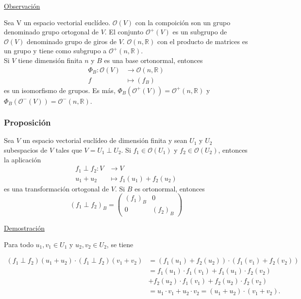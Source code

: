 \documentclass[12pt, a4paper, ones, notitlepage, openany,titlepage]{article}
\begin{document}
\noindent\underline{Observación}

Sea V un espacio vectorial euclídeo. $\mathcal{O}(V)$ con la compoición son un grupo denominado grupo ortogonal de $V$. El conjunto $\mathcal{O}^+(V)$ es un subgrupo de $\mathcal{O}(V)$ denominado grupo de giros de $V$. $\mathcal{O}(n,\mathbb{R})$ con el producto de matrices es un grupo y tiene como subgrupo a $\mathcal{O}^+(n, \mathbb{R})$.\\
Si $V$ tiene dimensión finita $n$ y $B$ es una base ortonormal, entonces
$$
\begin{aligned}
	\Phi_B : \mathcal{O}(V) & \longrightarrow \mathcal{O}(n,\mathbb{R}) \\
	f & \longmapsto (f_B)
\end{aligned}
$$
\noindent es un isomorfismo de grupos. Es más, $\Phi_B(\mathcal{O}^+(V)) = \mathcal{O}^+(n, \mathbb{R})$ y $\Phi_B(\mathcal{O}^-(V)) = \mathcal{O}^-(n, \mathbb{R})$. 

\subsubsection{Proposición}
Sea $V$ un espacio vectorial euclídeo de dimensión finita y sean $U_{1}$ y $U_{2}$ subespacios de $V$ tales que $V=U_{1} \perp U_{2}$. Si $f_{1} \in \mathcal{O}\left(U_{1}\right)$ y $f_{2} \in \mathcal{O}\left(U_{2}\right)$, entonces la aplicación
$$
\begin{aligned}
	f_{1} \perp f_{2}: V & \longrightarrow V \\
	u_1 + u_2 & \longmapsto f_1(u_1) + f_2(u_2)
\end{aligned}
$$
\noindent es una transformación ortogonal de $V$. Si $B$ es ortonormal, entonces
$$
(f_1 \perp f_2)_B = 
\left(\begin{array}{c|c}
	(f_1)_B & 0 \\
	\hline
	0 & (f_2)_B
\end{array}\right)
$$

\noindent\underline{Demostración}

\noindent Para todo $u_{1}, v_{1} \in U_{1}$ y $u_{2}, v_{2} \in U_{2}$, se tiene

$$
\begin{aligned}
	\left(f_{1} \perp f_{2}\right)\left(u_{1}+u_{2}\right) \cdot\left(f_{1} \perp f_{2}\right)\left(v_{1}+v_{2}\right) & =\left(f_{1}\left(u_{1}\right)+f_{2}\left(u_{2}\right)\right) \cdot\left(f_{1}\left(v_{1}\right)+f_{2}\left(v_{2}\right)\right) \\
	& =f_{1}\left(u_{1}\right) \cdot f_{1}\left(v_{1}\right)+f_{1}\left(u_{1}\right) \cdot f_{2}\left(v_{2}\right) \\
	& +f_{2}\left(u_{2}\right) \cdot f_{1}\left(v_{1}\right)+f_{2}\left(u_{2}\right) \cdot f_{2}\left(v_{2}\right) \\
	& =u_{1} \cdot v_{1}+u_{2} \cdot v_{2}=\left(u_{1}+u_{2}\right) \cdot\left(v_{1}+v_{2}\right) .
\end{aligned}
$$
\end{document}
